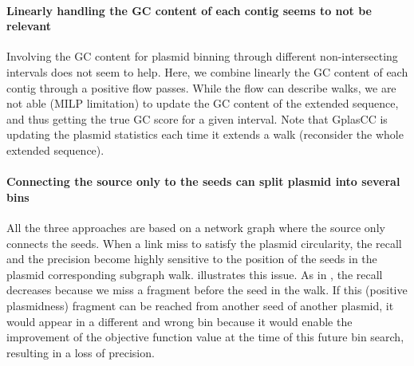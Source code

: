 \paragraph{Linearly handling the GC content of each contig seems to not be relevant}
Involving the GC content for plasmid binning through different non-intersecting intervals does not seem to help.
Here, we combine linearly the GC content of each contig through a positive flow passes.
While the flow can describe walks, we are not able (MILP limitation) to update the GC content of the extended sequence, and thus getting the true GC score for a given interval.
Note that GplasCC is updating the plasmid statistics each time it extends a walk (reconsider the whole extended sequence).

\paragraph{Connecting the source only to the seeds can split plasmid into several bins}
All the three approaches are based on a network graph where the source only connects the seeds.
When a link miss to satisfy the plasmid circularity, the recall and the precision become highly sensitive to the position of the seeds in the plasmid corresponding subgraph walk.
 illustrates this issue.
As in , the recall decreases because we miss a fragment before the seed in the walk.
If this (positive plasmidness) fragment can be reached from another seed of another plasmid, it would appear in a different and wrong bin because it would enable the improvement of the objective function value at the time of this future bin search, resulting in a loss of precision.

